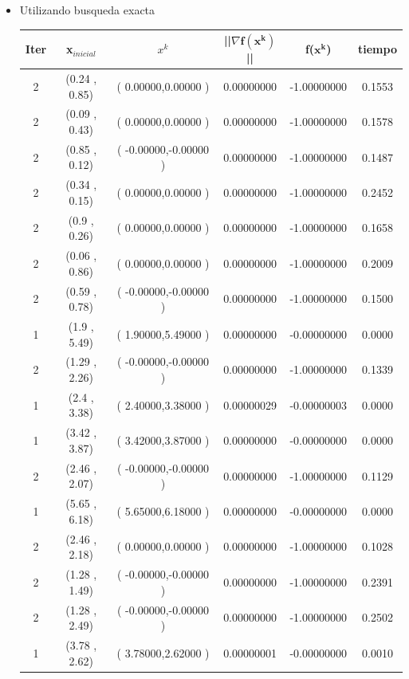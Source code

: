 
\begin{itemize}

\item Utilizando busqueda exacta

\begin{table}[H]
\centering
\renewcommand{\arraystretch}{1.2} 
\begin{tabular}{|c|c|c|c|c|c|}
\hline
\textbf{Iter} & \textbf{x$_{inicial}$} & \textbf{$x^k$} & \textbf{||$\nabla \mathbf{f(x^k)}$}|| & \textbf{f($\mathbf{x^k}$)}& \textbf{tiempo} \\
\hline
2  &  (0.24 , 0.85) &( 0.00000,0.00000 ) & 0.00000000 & -1.00000000 & 0.1553 \\
2  &  (0.09 , 0.43) &( 0.00000,0.00000 ) & 0.00000000 & -1.00000000 & 0.1578 \\
2  &  (0.85 , 0.12) &( -0.00000,-0.00000 ) & 0.00000000 & -1.00000000 & 0.1487 \\
2  &  (0.34 , 0.15) &( 0.00000,0.00000 ) & 0.00000000 & -1.00000000 & 0.2452 \\
2  &  (0.9 , 0.26) &( 0.00000,0.00000 ) & 0.00000000 & -1.00000000 & 0.1658 \\
2  &  (0.06 , 0.86) &( 0.00000,0.00000 ) & 0.00000000 & -1.00000000 & 0.2009 \\
2  &  (0.59 , 0.78) &( -0.00000,-0.00000 ) & 0.00000000 & -1.00000000 & 0.1500 \\
1  &  (1.9 , 5.49) &( 1.90000,5.49000 ) & 0.00000000 & -0.00000000 & 0.0000 \\
2  &  (1.29 , 2.26) &( -0.00000,-0.00000 ) & 0.00000000 & -1.00000000 & 0.1339 \\
1  &  (2.4 , 3.38) &( 2.40000,3.38000 ) & 0.00000029 & -0.00000003 & 0.0000 \\
1  &  (3.42 , 3.87) &( 3.42000,3.87000 ) & 0.00000000 & -0.00000000 & 0.0000 \\
2  &  (2.46 , 2.07) &( -0.00000,-0.00000 ) & 0.00000000 & -1.00000000 & 0.1129 \\
1  &  (5.65 , 6.18) &( 5.65000,6.18000 ) & 0.00000000 & -0.00000000 & 0.0000 \\
2  &  (2.46 , 2.18) &( 0.00000,0.00000 ) & 0.00000000 & -1.00000000 & 0.1028 \\
2  &  (1.28 , 1.49) &( -0.00000,-0.00000 ) & 0.00000000 & -1.00000000 & 0.2391 \\
2  &  (1.28 , 2.49) &( -0.00000,-0.00000 ) & 0.00000000 & -1.00000000 & 0.2502 \\
1  &  (3.78 , 2.62) &( 3.78000,2.62000 ) & 0.00000001 & -0.00000000 & 0.0010 \\
\hline
\end{tabular}
\end{table}



\end{itemize}

